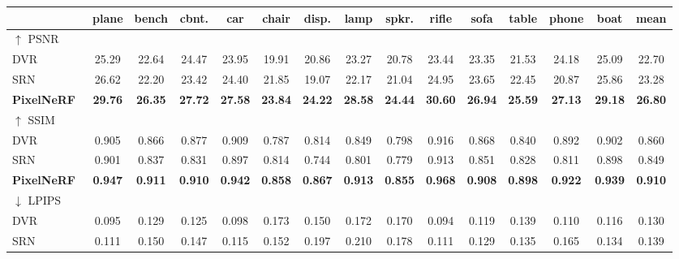 \begin{enrichment}
\begin{enrichment}
     \begin{table}[H]
         \centering
         \small
         \setlength{\tabcolsep}{4pt}
         \begin{tabular}{|l|ccccccccccccc|c|}
             \hline
             & plane & bench & cbnt. & car & chair & disp. & lamp & spkr. & rifle & sofa & table & phone & boat & mean \\
             \hline
             $\uparrow$ PSNR & & & & & & & & & & & & & & \\
             DVR~\cite{niemeyer2020_dvr} & 25.29 & 22.64 & 24.47 & 23.95 & 19.91 & 20.86 & 23.27 & 20.78 & 23.44 & 23.35 & 21.53 & 24.18 & 25.09 & 22.70 \\
             SRN~\cite{sitzmann2019_srn} & 26.62 & 22.20 & 23.42 & 24.40 & 21.85 & 19.07 & 22.17 & 21.04 & 24.95 & 23.65 & 22.45 & 20.87 & 25.86 & 23.28 \\
             \textbf{PixelNeRF}~\cite{yu2020_pixelnerf} & \textbf{29.76} & \textbf{26.35} & \textbf{27.72} & \textbf{27.58} & \textbf{23.84} & \textbf{24.22} & \textbf{28.58} & \textbf{24.44} & \textbf{30.60} & \textbf{26.94} & \textbf{25.59} & \textbf{27.13} & \textbf{29.18} & \textbf{26.80} \\
             \hline
             $\uparrow$ SSIM & & & & & & & & & & & & & & \\
             DVR~\cite{niemeyer2020_dvr} & 0.905 & 0.866 & 0.877 & 0.909 & 0.787 & 0.814 & 0.849 & 0.798 & 0.916 & 0.868 & 0.840 & 0.892 & 0.902 & 0.860 \\
             SRN~\cite{sitzmann2019_srn} & 0.901 & 0.837 & 0.831 & 0.897 & 0.814 & 0.744 & 0.801 & 0.779 & 0.913 & 0.851 & 0.828 & 0.811 & 0.898 & 0.849 \\
             \textbf{PixelNeRF}~\cite{yu2020_pixelnerf} & \textbf{0.947} & \textbf{0.911} & \textbf{0.910} & \textbf{0.942} & \textbf{0.858} & \textbf{0.867} & \textbf{0.913} & \textbf{0.855} & \textbf{0.968} & \textbf{0.908} & \textbf{0.898} & \textbf{0.922} & \textbf{0.939} & \textbf{0.910} \\
             \hline
             $\downarrow$ LPIPS & & & & & & & & & & & & & & \\
             DVR~\cite{niemeyer2020_dvr} & 0.095 & 0.129 & 0.125 & 0.098 & 0.173 & 0.150 & 0.172 & 0.170 & 0.094 & 0.119 & 0.139 & 0.110 & 0.116 & 0.130 \\
             SRN~\cite{sitzmann2019_srn} & 0.111 & 0.150 & 0.147 & 0.115 & 0.152 & 0.197 & 0.210 & 0.178 & 0.111 & 0.129 & 0.135 & 0.165 & 0.134 & 0.139 \\

\end{tabular}
\end{table}
\end{enrichment}
\end{enrichment}
